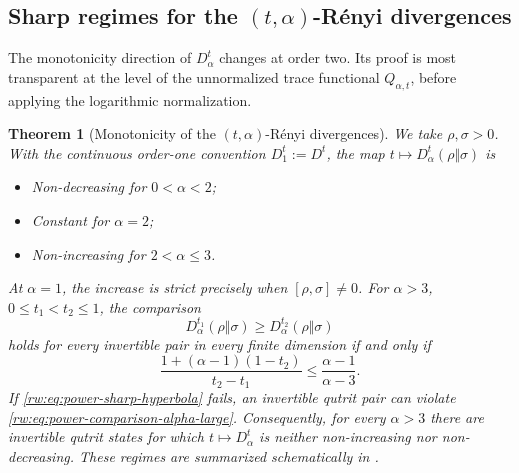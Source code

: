 \documentclass[11pt]{article}
\newtheorem{theorem}[theorem]{Theorem}
\theoremstyle{remark}
\newcommand{\1}{\mathbbm{1}}
\begin{document}
\subsection{Sharp regimes for the
\texorpdfstring{$(t,\alpha)$}{(t,alpha)}-R\'enyi divergences}
\label{rw:subsec:renyi-t-monotonicity}

The monotonicity direction of $D_\alpha^t$ changes at order two.  Its
proof is most transparent at the level of the unnormalized trace
functional $Q_{\alpha,t}$, before applying the logarithmic
normalization.

\begin{theorem}[Monotonicity of the $(t,\alpha)$-R\'enyi divergences]
\label{rw:thm:power-t-monotonicity}
We take $\rho,\sigma>0$.  With the continuous order-one convention
$D_1^t:=D^t$, the map
$t\mapsto D_\alpha^t(\rho\Vert\sigma)$ is
\begin{itemize}
 \item Non-decreasing for $0<\alpha<2$;
 \item Constant for $\alpha=2$;
 \item Non-increasing for $2<\alpha\leq3$.
\end{itemize}
At $\alpha=1$, the increase is strict precisely when
$[\rho,\sigma]\neq0$.
For $\alpha>3$, $0\leq t_1<t_2\leq1$, the comparison
\begin{equation}
 D_\alpha^{t_1}(\rho\Vert\sigma)
 \geq D_\alpha^{t_2}(\rho\Vert\sigma)
 \label{rw:eq:power-comparison-alpha-large}
\end{equation}
holds for every invertible pair in every finite dimension if and only if
\begin{equation}
 \frac{1+(\alpha-1)(1-t_2)}{t_2-t_1}
 \leq\frac{\alpha-1}{\alpha-3}.
 \label{rw:eq:power-sharp-hyperbola}
\end{equation}
If \eqref{rw:eq:power-sharp-hyperbola} fails, an invertible qutrit pair
can violate \eqref{rw:eq:power-comparison-alpha-large}.
Consequently, for every $\alpha>3$ there are invertible qutrit states
for which $t\mapsto D_\alpha^t$ is neither non-increasing nor
non-decreasing.  These regimes are summarized schematically in
.
\end{theorem}
\end{document}
